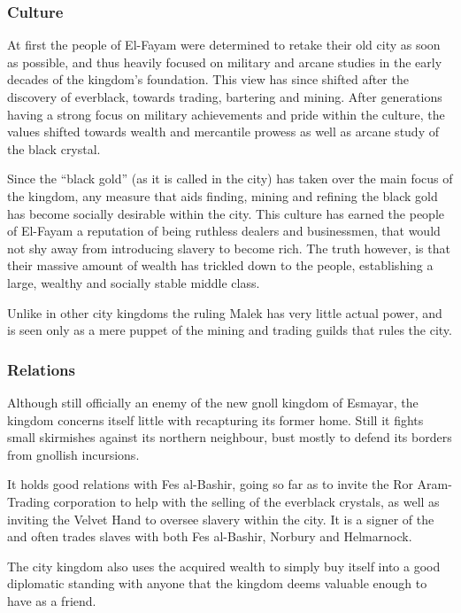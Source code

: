\subsubsection{Culture}

At first the people of El-Fayam were determined to retake their old city as
soon as possible, and thus heavily focused on military and arcane studies in
the early decades of the kingdom's foundation. This view has since shifted after
the discovery of everblack, towards trading, bartering and mining. After
generations having a strong focus on military achievements and pride within
the culture, the values shifted towards wealth and mercantile prowess as well
as arcane study of the black crystal.

Since the ``black gold'' (as it is called in the city) has taken over the main
focus of the kingdom, any measure that aids finding, mining and refining the
black gold has become socially desirable within the city. This culture has
earned the people of El-Fayam a reputation of being ruthless dealers and
businessmen, that would not shy away from introducing slavery to become rich.
The truth however, is that their massive amount of wealth has trickled down
to the people, establishing a large, wealthy and socially stable middle class.

Unlike in other city kingdoms the ruling Malek has very little actual power,
and is seen only as a mere puppet of the mining and trading guilds that
rules the city.


\subsubsection{Relations}

Although still officially an enemy of the new gnoll kingdom of Esmayar, the
kingdom concerns itself little with recapturing its former home. Still it
fights small skirmishes against its northern neighbour, bust mostly to
defend its borders from gnollish incursions.

It holds good relations with Fes al-Bashir, going so far as to invite the Ror
Aram-Trading corporation to help with the selling of the everblack crystals,
as well as inviting the Velvet Hand to oversee slavery within the city. It is
a signer of the  and often trades slaves with both
Fes al-Bashir, Norbury and Helmarnock.

The city kingdom also uses the acquired wealth to simply buy itself into
a good diplomatic standing with anyone that the kingdom deems valuable enough
to have as a friend.

